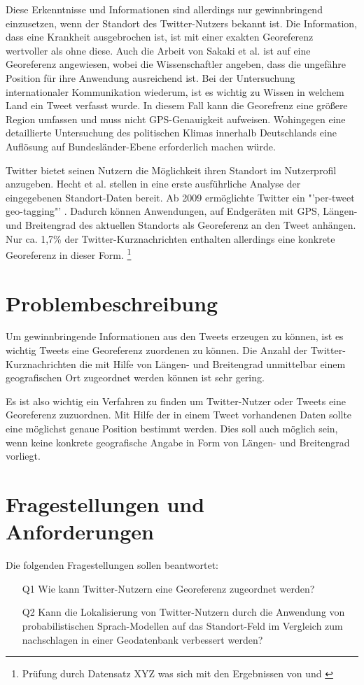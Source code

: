 		Diese Erkenntnisse und Informationen sind allerdings nur gewinnbringend einzusetzen, wenn der Standort des Twitter-Nutzers bekannt ist. 
		Die Information, dass eine Krankheit ausgebrochen ist, ist mit einer exakten Georeferenz wertvoller als ohne diese. 
		Auch die Arbeit von Sakaki et al. ist auf eine Georeferenz angewiesen, wobei die Wissenschaftler angeben, dass die ungefähre Position für ihre Anwendung ausreichend ist.
		Bei der Untersuchung internationaler Kommunikation wiederum, ist es wichtig zu Wissen in welchem Land ein Tweet verfasst wurde.
		In diesem Fall kann die Georefrenz eine größere Region umfassen und muss nicht GPS-Genauigkeit aufweisen.  
		Wohingegen eine detaillierte Untersuchung des politischen Klimas innerhalb Deutschlands eine Auflösung auf Bundesländer-Ebene erforderlich machen würde. 

 		Twitter bietet seinen Nutzern die Möglichkeit ihren Standort im Nutzerprofil anzugeben. 
 		Hecht et al. stellen in \cite{Hecht2011} eine erste ausführliche Analyse der eingegebenen Standort-Daten bereit.  
 		Ab 2009 ermöglichte Twitter ein "'per-tweet geo-tagging"' \cite{Cheng2010}.
 		Dadurch können Anwendungen, auf Endgeräten mit GPS, Längen- und Breitengrad des aktuellen Standorts als Georeferenz an den Tweet anhängen.    
		Nur ca. 1,7\% der Twitter-Kurznachrichten enthalten allerdings eine konkrete Georeferenz in dieser Form. \footnote{Prüfung durch Datensatz XYZ was sich mit den Ergebnissen von \cite{Priedhorsky2013} und \cite{Schulz2013}}


	\section{Problembeschreibung} 
		Um gewinnbringende Informationen aus den Tweets erzeugen zu können, ist es wichtig Tweets eine Georeferenz zuordenen zu können.
		Die Anzahl der Twitter-Kurznachrichten die mit Hilfe von Längen- und Breitengrad unmittelbar einem geografischen Ort zugeordnet werden können ist sehr gering. 
		
		Es ist also wichtig ein Verfahren zu finden um Twitter-Nutzer oder Tweets eine Georeferenz zuzuordnen. 
		Mit Hilfe der in einem Tweet vorhandenen Daten sollte eine möglichst genaue Position bestimmt werden. 
		Dies soll auch möglich sein, wenn keine konkrete geografische Angabe in Form von Längen- und Breitengrad vorliegt. 

	\section{Fragestellungen und Anforderungen}\label{sec:fragestellung}
		Die folgenden Fragestellungen sollen beantwortet: 
		\begin{enumerate}
			\item[Q1] Wie kann Twitter-Nutzern eine Georeferenz zugeordnet werden?
			\item[Q2] Kann die Lokalisierung von Twitter-Nutzern durch die Anwendung von probabilistischen Sprach-Modellen auf das Standort-Feld im Vergleich zum nachschlagen in einer Geodatenbank verbessert werden?  
		\end{enumerate}
		  

